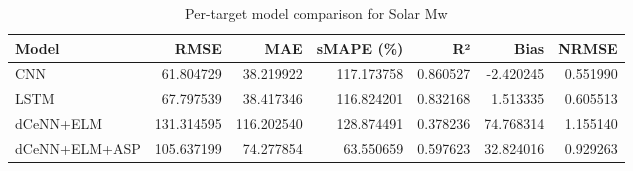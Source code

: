\begin{table}
\caption{Per-target model comparison for Solar Mw}
\begin{tabular}{lrrrrrr}
\toprule
Model & RMSE & MAE & sMAPE (\%) & R² & Bias & NRMSE \\
\midrule
CNN & 61.804729 & 38.219922 & 117.173758 & 0.860527 & -2.420245 & 0.551990 \\
LSTM & 67.797539 & 38.417346 & 116.824201 & 0.832168 & 1.513335 & 0.605513 \\
dCeNN+ELM & 131.314595 & 116.202540 & 128.874491 & 0.378236 & 74.768314 & 1.155140 \\
dCeNN+ELM+ASP & 105.637199 & 74.277854 & 63.550659 & 0.597623 & 32.824016 & 0.929263 \\
\bottomrule
\end{tabular}
\end{table}
